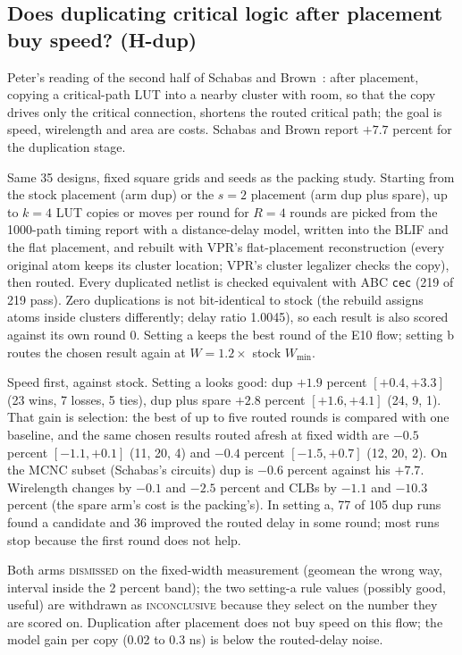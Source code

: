 \subsection{Does duplicating critical logic after placement buy speed? (H-dup)}
\label{sec:e-dup}

 Peter's reading of the second half of Schabas and Brown~\cite{schabas2003duplication}: after placement, copying a critical-path LUT into a nearby cluster with room, so that the copy drives only the critical connection, shortens the routed critical path; the goal is speed, wirelength and area are costs. Schabas and Brown report $+7.7$ percent for the duplication stage.

 Same 35 designs, fixed square grids and seeds as the packing study. Starting from the stock placement (arm dup) or the $s=2$ placement (arm dup plus spare), up to $k=4$ LUT copies or moves per round for $R=4$ rounds are picked from the 1000-path timing report with a distance-delay model, written into the BLIF and the flat placement, and rebuilt with VPR's flat-placement reconstruction (every original atom keeps its cluster location; VPR's cluster legalizer checks the copy), then routed. Every duplicated netlist is checked equivalent with ABC \texttt{cec} (219 of 219 pass). Zero duplications is not bit-identical to stock (the rebuild assigns atoms inside clusters differently; delay ratio 1.0045), so each result is also scored against its own round 0. Setting a keeps the best round of the E10 flow; setting b routes the chosen result again at $W=1.2\times$ stock $W_{\min}$.

 Speed first, against stock. Setting a looks good: dup $+1.9$ percent $[+0.4,+3.3]$ (23 wins, 7 losses, 5 ties), dup plus spare $+2.8$ percent $[+1.6,+4.1]$ (24, 9, 1). That gain is selection: the best of up to five routed rounds is compared with one baseline, and the same chosen results routed afresh at fixed width are $-0.5$ percent $[-1.1,+0.1]$ (11, 20, 4) and $-0.4$ percent $[-1.5,+0.7]$ (12, 20, 2). On the MCNC subset (Schabas's circuits) dup is $-0.6$ percent against his $+7.7$. Wirelength changes by $-0.1$ and $-2.5$ percent and CLBs by $-1.1$ and $-10.3$ percent (the spare arm's cost is the packing's). In setting a, 77 of 105 dup runs found a candidate and 36 improved the routed delay in some round; most runs stop because the first round does not help.

 Both arms \textsc{dismissed} on the fixed-width measurement (geomean the wrong way, interval inside the 2 percent band); the two setting-a rule values (possibly good, useful) are withdrawn as \textsc{inconclusive} because they select on the number they are scored on. Duplication after placement does not buy speed on this flow; the model gain per copy (0.02 to 0.3 ns) is below the routed-delay noise.
